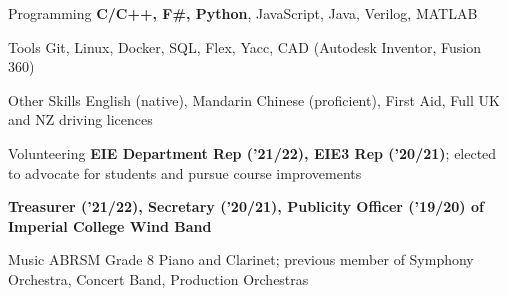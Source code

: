 

\begin{cvskills}


  \cvskill
    {Programming} %
    {\textbf{C/C++, F\#, Python}, JavaScript, Java, Verilog, MATLAB} %

  \cvskill
    {Tools} %
    {Git, Linux, Docker, SQL, Flex, Yacc, CAD (Autodesk Inventor, Fusion 360)} %

  \cvskill
    {Other Skills}
    {English (native), Mandarin Chinese (proficient), First Aid, Full UK and NZ driving licences}

  \cvskill
    {Volunteering} %
    {\textbf{EIE Department Rep ('21/22), EIE3 Rep ('20/21)}; elected to advocate for students and pursue course improvements} %

  \cvskill
    {} %
    {\textbf{Treasurer ('21/22), Secretary ('20/21), Publicity Officer ('19/20) of Imperial College Wind Band}} %



  \cvskill
    {Music} %
    {ABRSM Grade 8 Piano and Clarinet; previous member of Symphony Orchestra, Concert Band, Production Orchestras} %


\end{cvskills}
